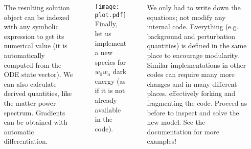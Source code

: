 \documentclass[20pt, a0paper, portrait]{tikzposter}
\begin{document}
\begin{columns}
{    The resulting solution object can be indexed with any symbolic expression to get its numerical value (it is automatically computed from the ODE state vector).
    We can also calculate derived quantities, like the matter power spectrum.
    Gradients can be obtained with automatic differentiation.
    \begin{codeinbox}
    \end{codeinbox}
    \texttt{[image: plot.pdf]}
    Finally, let us implement a new species for $w_0 w_a$ dark energy (as if it is not already available in the code).
    \begin{codeinbox}
    \end{codeinbox}
    We only had to write down the equations; not modify any internal code.
    Everything (e.g. background and perturbation quantities) is defined in the same place to encourage modularity.
    Similar implementations in other codes can require many more changes and in many different places, effectively forking and fragmenting the code.
    Proceed as before to inspect and solve the new model. See the documentation for more examples!
}

\end{columns}
\end{document}
